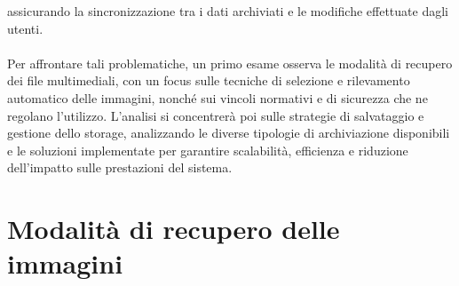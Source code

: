 assicurando la sincronizzazione tra i dati archiviati e le modifiche effettuate dagli utenti.\\
\\
Per affrontare tali problematiche, 
un primo esame osserva le modalità di recupero dei file multimediali,
con un focus sulle tecniche di selezione e rilevamento automatico delle immagini, 
nonché sui vincoli normativi e di sicurezza che ne regolano l'utilizzo.
L'analisi si concentrerà poi
sulle strategie di salvataggio e gestione dello storage,
analizzando le diverse tipologie di archiviazione disponibili e le soluzioni implementate 
per garantire scalabilità, efficienza e riduzione dell'impatto sulle prestazioni del sistema.\\

\section{Modalità di recupero delle immagini }

